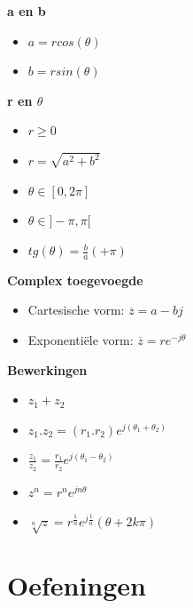 \documentclass[12pt]{report}
\newcommand{\important}[1] {\textbf{\color{orange}#1}}
\begin{document}
\important{a en b}
\begin{itemize}
 \item $a = rcos(\theta)$
 \item $b = rsin(\theta)$
\end{itemize}
\important{r en $\theta$}
\begin{itemize}
 \item $r \geq 0$
 \item $r = \sqrt{a^2 + b^2}$
 
 \item $\theta \in [0, 2\pi]$
 \item $\theta \in ]-\pi, \pi[$
 \item $tg(\theta) = \frac{b}{a} (+ \pi)$
\end{itemize}
\important{Complex toegevoegde}
\begin{itemize}
 \item Cartesische vorm: $\overline{z} = a - bj$ 
 \item Exponentiële vorm: $\overline{z} = re^{-j\theta}$
\end{itemize}
\important{Bewerkingen}
\begin{itemize}
 \item $z_1 + z_2$
 \item $z_1 . z_2 = (r_1 . r_2)e^{j(\theta_1 + \theta_2)}$
 \item $\frac{z_1}{z_2} = \frac{r_1}{r_2}e^{j(\theta_1 - \theta_2)}$
 \item $z^{n} = r^{n}e^{jn\theta}$
 \item $\sqrt[n]{z} = r^{\frac{1}{n}}e^{j\frac{1}{n}}(\theta + 2k\pi)$
\end{itemize}


\part{Oefeningen}
\end{document}

